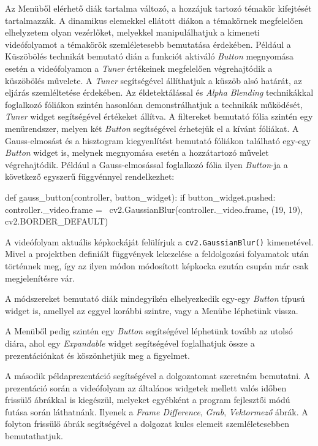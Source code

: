 Az Menüből elérhető diák tartalma változó, a hozzájuk tartozó témakör kifejtését tartalmazzák. A dinamikus elemekkel ellátott diákon a témakörnek megfelelően elhelyzetem olyan vezérlőket, melyekkel manipulálhatjuk a kimeneti videófolyamot a témakörök szemléletesebb bemutatása érdekében.
Például a Küszöbölés technikát bemutató dián a funkciót aktiváló \textit{Button} megnyomása esetén a videófolyamon a \textit{Tuner} értékeinek megfelelően végrehajtódik a küszöbölés művelete. A \textit{Tuner} segítségével állíthatjuk a küszöb alsó határát, az eljárás szemléltetése érdekében.
Az éldetektálással és \textit{Alpha Blending} technikákkal foglalkozó fóliákon szintén hasonlóan demonstrálhatjuk a technikák működését, \textit{Tuner} widget segítségével értékeket állítva.
A filtereket bemutató fólia szintén egy menürendszer, melyen két \textit{Button} segítségével érhetejük el a kívánt fóliákat. A Gauss-elmosást és a hisztogram kiegyenlítést bemutató fóliákon található egy-egy \textit{Button} widget is, melynek megnyomása esetén a hozzátartozó művelet végrehajtódik. Például a Gauss-elmosással foglalkozó fólia ilyen \textit{Button}-ja a következő egyszerű függvénnyel rendelkezhet:
\begin{python}
def gauss_button(controller, button_widget):
    if button_widget.pushed:
        controller._video.frame = \
        		cv2.GaussianBlur(controller._video.frame,
					(19, 19),
					cv2.BORDER_DEFAULT)
\end{python}
A videófolyam aktuális képkockáját felülírjuk a \texttt{cv2.GaussianBlur()} kimenetével. Mivel a projektben definiált függvények lekezelése a feldolgozási folyamatok után történnek meg, így az ilyen módon módosított képkocka ezután csupán már csak megjelenítésre vár.

A módszereket bemutató diák mindegyikén elhelyezkedik egy-egy \textit{Button} típusú widget is, amellyel az eggyel korábbi szintre, vagy a Menübe léphetünk vissza.

A Menüből pedig szintén egy \textit{Button} segítségével léphetünk tovább az utolsó diára, ahol egy \textit{Expandable} widget segítségével foglalhatjuk össze a prezentációnkat és köszönhetjük meg a figyelmet.


A második példaprezentáció segítségével a dolgozatomat szeretném bemutatni.
A prezentáció során a videófolyam az általános widgetek mellett valós időben frissülő ábrákkal is kiegészül, melyeket egyébként a program fejlesztői módú futása során láthatnánk. Ilyenek a \textit{Frame Difference}, \textit{Grab}, \textit{Vektormező} ábrák. A folyton frissülő ábrák segítségével a dolgozat kulcs elemeit szemléletesebben bemutathatjuk.

